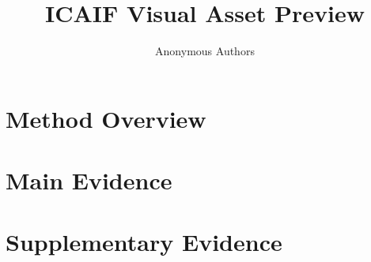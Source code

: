 \documentclass[sigconf,nonacm]{acmart}
\title{ICAIF Visual Asset Preview}
\author{Anonymous Authors}
\begin{document}
\maketitle

\section{Method Overview}

\clearpage

\section{Main Evidence}



\clearpage

\section{Supplementary Evidence}


\clearpage

\clearpage

\clearpage
\end{document}
